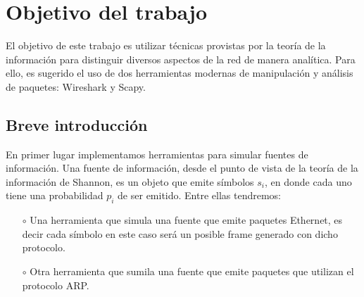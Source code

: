 \section{Objetivo del trabajo}

El objetivo de este trabajo es utilizar técnicas provistas por la teoría de la información para distinguir
diversos aspectos de la red de manera analítica. Para ello, es sugerido el uso de dos herramientas modernas
de manipulación y análisis de paquetes: Wireshark y Scapy.

\subsection{Breve introducción}

En primer lugar implementamos herramientas para simular fuentes de informaci\'on. Una fuente de informaci\'on, desde el punto de vista de la teor\'ia de la informaci\'on de Shannon, es un objeto que emite s\'imbolos $s_i$, en donde cada uno tiene una probabilidad $p_i$ de ser emitido. Entre ellas tendremos:

\begin{itemize}
\item[$\circ$]Una herramienta que simula una fuente que emite paquetes Ethernet, es decir cada s\'imbolo en este caso ser\'a un posible frame generado con dicho protocolo.
\item[$\circ$]Otra herramienta que sumila una fuente que emite paquetes que utilizan el protocolo ARP.
\end{itemize}


